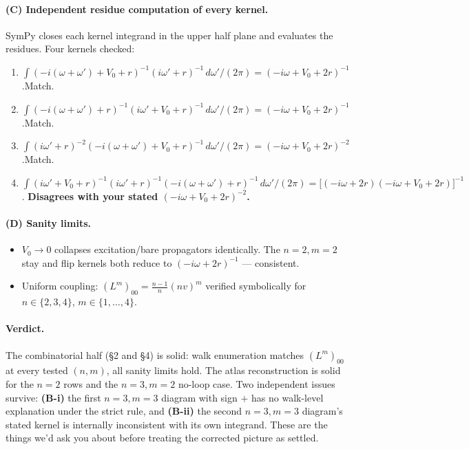 \documentclass[11pt,a4paper]{article}
\begin{document}
\paragraph{(C) Independent residue computation of every kernel.}
SymPy closes each kernel integrand in the upper half plane and
evaluates the residues. Four kernels checked:
\begin{enumerate}[leftmargin=2em,itemsep=2pt]
\item $\int(-i(\omega+\omega')+V_{0}+r)^{-1}(i\omega'+r)^{-1}\,d\omega'/(2\pi)
=(-i\omega+V_{0}+2r)^{-1}$.\quad Match.
\item $\int(-i(\omega+\omega')+r)^{-1}(i\omega'+V_{0}+r)^{-1}\,d\omega'/(2\pi)
=(-i\omega+V_{0}+2r)^{-1}$.\quad Match.
\item $\int(i\omega'+r)^{-2}(-i(\omega+\omega')+V_{0}+r)^{-1}\,d\omega'/(2\pi)
=(-i\omega+V_{0}+2r)^{-2}$.\quad Match.
\item $\int(i\omega'+V_{0}+r)^{-1}(i\omega'+r)^{-1}(-i(\omega+\omega')+r)^{-1}\,d\omega'/(2\pi)
=\big[(-i\omega+2r)(-i\omega+V_{0}+2r)\big]^{-1}$.\quad
\textbf{Disagrees with your stated $(-i\omega+V_{0}+2r)^{-2}$.}
\end{enumerate}

\paragraph{(D) Sanity limits.}
\begin{itemize}[leftmargin=2em,itemsep=2pt]
\item $V_{0}\!\to\!0$ collapses excitation/bare propagators identically.
The $n{=}2,m{=}2$ stay and flip kernels both reduce to
$(-i\omega+2r)^{-1}$ --- consistent.
\item Uniform coupling: $(L^{m})_{00}=\frac{n-1}{n}(nv)^{m}$ verified
symbolically for $n\!\in\!\{2,3,4\}$, $m\!\in\!\{1,\dots,4\}$.
\end{itemize}

\paragraph{Verdict.}
The combinatorial half (\S 2 and \S 4) is solid: walk enumeration
matches $(L^{m})_{00}$ at every tested $(n,m)$, all sanity limits hold.
The atlas reconstruction is solid for the $n{=}2$ rows and the
$n{=}3,m{=}2$ no-loop case. Two independent issues survive:
\textbf{(B-i)} the first $n{=}3,m{=}3$ diagram with sign $+$ has no
walk-level explanation under the strict rule, and
\textbf{(B-ii)} the second $n{=}3,m{=}3$ diagram's stated kernel is
internally inconsistent with its own integrand. These are the things
we'd ask you about before treating the corrected picture as settled.
\end{document}
